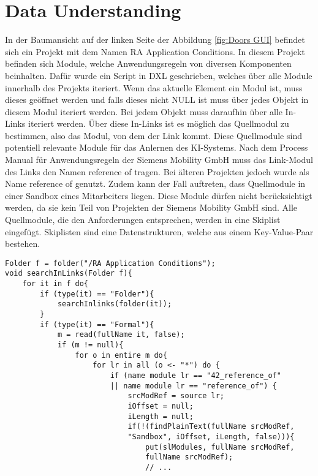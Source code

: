 \section{Data Understanding}
\label{chap:DataUnderstanding}

In der Baumansicht auf der linken Seite der Abbildung \ref*{fig:Doors GUI} befindet sich ein Projekt mit dem Namen \glqq RA Application Conditions\grqq{}. In diesem Projekt befinden sich Module, welche
Anwendungsregeln von diversen Komponenten beinhalten. Dafür wurde ein Script in \acs{DXL} geschrieben, welches über alle Module innerhalb des Projekts iteriert. Wenn das aktuelle Element ein Modul ist,
muss dieses geöffnet werden und falls dieses nicht NULL ist muss über jedes Objekt in diesem Modul iteriert werden. Bei jedem Objekt muss daraufhin über alle In-Links iteriert werden. Über diese 
In-Links ist es möglich das Quellmodul zu bestimmen, also das Modul, von dem der Link kommt. Diese Quellmodule sind potentiell relevante Module für das Anlernen des KI-Systems. Nach dem Process Manual für
Anwendungsregeln der Siemens Mobility GmbH \cite[S.32]{q2} muss das Link-Modul des Links den Namen  reference of\grqq{} tragen. Bei älteren Projekten jedoch wurde als Name 
\glqq reference of\grqq{} genutzt. Zudem kann der Fall auftreten, dass Quellmodule in einer Sandbox eines Mitarbeiters liegen. Diese Module dürfen nicht berücksichtigt werden, da sie kein Teil
von Projekten der Siemens Mobility GmbH sind. Alle Quellmodule, die den Anforderungen entsprechen, werden in eine Skiplist eingefügt. Skiplisten sind eine Datenstrukturen, welche aus einem 
Key-Value-Paar bestehen. 

\begin{lstlisting}[caption={Iterieren über alle Module von RA Application Conditions},captionpos=b, label = lst:searchInLinks]
Folder f = folder("/RA Application Conditions");
void searchInLinks(Folder f){
    for it in f do{
        if (type(it) == "Folder"){
            searchInlinks(folder(it));
        }
        if (type(it) == "Formal"){
            m = read(fullName it, false);
            if (m != null){
                for o in entire m do{
                    for lr in all (o <- "*") do {
                        if (name module lr == "42_reference_of" 
                        || name module lr == "reference_of") {
                            srcModRef = source lr;
                            iOffset = null;
                            iLength = null;
                            if(!(findPlainText(fullName srcModRef, 
                            "Sandbox", iOffset, iLength, false))){
                                put(slModules, fullName srcModRef, 
                                fullName srcModRef);
                                // ...
\end{lstlisting}

